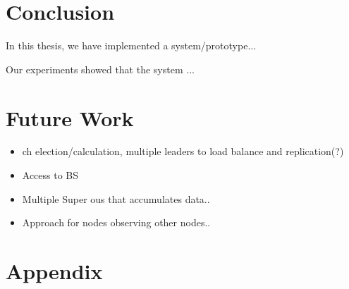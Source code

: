 \documentclass[USenglish]{uit-thesis}
\begin{document}
\chapter{Conclusion}
In this thesis, we have implemented a system/prototype...

Our experiments showed that the system ...


\chapter{Future Work}

\begin{itemize}
\item \gls{ch} election/calculation, multiple leaders to load balance and replication(?)
\item Access to BS
\item Multiple Super \gls{ou}s that accumulates data..
\item Approach for nodes observing other nodes..
\end{itemize}

\chapter{Appendix}

\backmatter


\newpage{}
\end{document}
